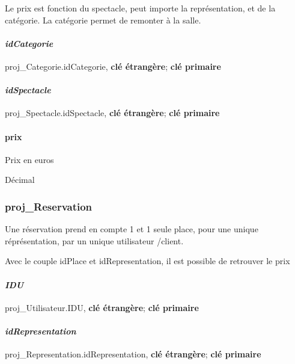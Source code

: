 Le prix est fonction du spectacle, peut importe la représentation, et de
la catégorie. La catégorie permet de remonter à la salle.

\paragraph{\texorpdfstring{\textbf{\emph{idCategorie}}}{idCategorie}}\label{idcategorie-2}

proj\_Categorie.idCategorie, \textbf{clé étrangère}; \textbf{clé
primaire}

\paragraph{\texorpdfstring{\textbf{\emph{idSpectacle}}}{idSpectacle}}\label{idspectacle-2}

proj\_Spectacle.idSpectacle, \textbf{clé étrangère}; \textbf{clé
primaire}

\paragraph{prix}\label{prix}

Prix en euros

Décimal

\subsubsection{proj\_Reservation}\label{projux5freservation}

Une réservation prend en compte 1 et 1 seule place, pour une unique
réprésentation, par un unique utilisateur /client.

Avec le couple idPlace et idRepresentation, il est possible de retrouver
le prix

\paragraph{\texorpdfstring{\textbf{\emph{IDU}}}{IDU}}\label{idu-1}

proj\_Utilisateur.IDU, \textbf{clé étrangère}; \textbf{clé primaire}

\paragraph{\texorpdfstring{\textbf{\emph{idRepresentation}}}{idRepresentation}}\label{idrepresentation-1}

proj\_Representation.idRepresentation, \textbf{clé étrangère};
\textbf{clé primaire}

